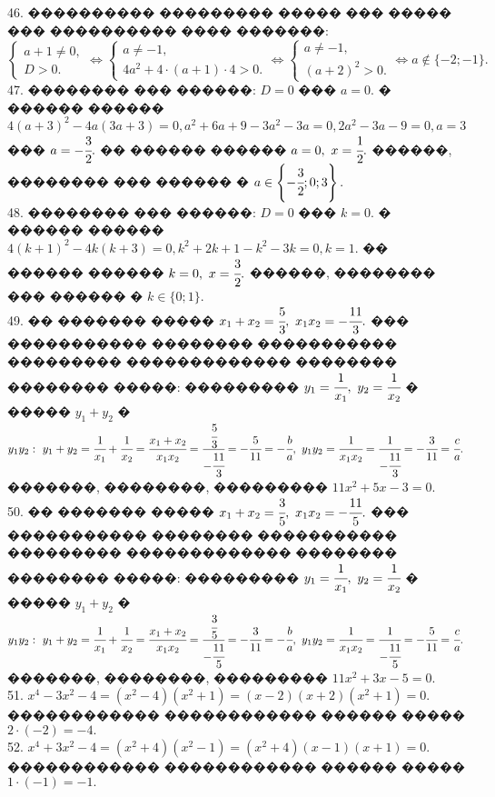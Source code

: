 \documentclass[12pt]{article}
\begin{document}
46. ���������� ��������� ����� ��� ����� ��� ���������� ���� �������:\\ $\begin{cases}a+1\neq0,\\ D>0.\end{cases}\Leftrightarrow
\begin{cases}a\neq-1,\\ 4a^2+4\cdot(a+1)\cdot4>0.\end{cases}\Leftrightarrow
\begin{cases}a\neq-1,\\ (a+2)^2>0.\end{cases}\Leftrightarrow a\notin\{-2;-1\}.$\\
47. �������� ��� ������: $D=0$ ��� $a=0.$ � ������ ������ $4(a+3)^2-4a(3a+3)=0, a^2+6a+9-3a^2-3a=0, 2a^2-3a-9=0, a=3$ ��� $a=-\cfrac{3}{2}.$ �� ������ ������ $a=0,\ x=\cfrac{1}{2}.$ ������, �������� ��� ������ � $a\in\left\{-\cfrac{3}{2}; 0; 3\right\}.$\\
48. �������� ��� ������: $D=0$ ��� $k=0.$ � ������ ������ $4(k+1)^2-4k(k+3)=0, k^2+2k+1-k^2-3k=0, k=1.$ �� ������ ������ $k=0,\ x=\cfrac{3}{2}.$ ������, �������� ��� ������ � $k\in\{0;1\}.$\\
49. �� ������� ����� $x_1+x_2=\cfrac{5}{3},\ x_1x_2=-\cfrac{11}{3}.$ ��� ����������� �������� ����������� ��������� ������������� �������� �������� �����: ��������� $y_1=\cfrac{1}{x_1},\ y_2=\cfrac{1}{x_2}$ � ����� $y_1+y_2$ � $y_1y_2:\ y_1+y_2=\cfrac{1}{x_1}+\cfrac{1}{x_2}=
\cfrac{x_1+x_2}{x_1x_2}=\cfrac{\cfrac{5}{3}}{-\cfrac{11}{3}}=-\cfrac{5}{11}=-\cfrac{b}{a},\ y_1y_2=\cfrac{1}{x_1x_2}=\cfrac{1}{-\cfrac{11}{3}}=-\cfrac{3}{11}=\cfrac{c}{a}.$ �������, ��������, ��������� $11x^2+5x-3=0.$\\
50. �� ������� ����� $x_1+x_2=\cfrac{3}{5},\ x_1x_2=-\cfrac{11}{5}.$ ��� ����������� �������� ����������� ��������� ������������� �������� �������� �����: ��������� $y_1=\cfrac{1}{x_1},\ y_2=\cfrac{1}{x_2}$ � ����� $y_1+y_2$ � $y_1y_2:\ y_1+y_2=\cfrac{1}{x_1}+\cfrac{1}{x_2}=
\cfrac{x_1+x_2}{x_1x_2}=\cfrac{\cfrac{3}{5}}{-\cfrac{11}{5}}=-\cfrac{3}{11}=-\cfrac{b}{a},\ y_1y_2=\cfrac{1}{x_1x_2}=\cfrac{1}{-\cfrac{11}{5}}=-\cfrac{5}{11}=\cfrac{c}{a}.$ �������, ��������, ��������� $11x^2+3x-5=0.$\\
51. $x^4-3x^2-4=(x^2-4)(x^2+1)=(x-2)(x+2)(x^2+1)=0.$ ������������ ������������ ������ ����� $2\cdot(-2)=-4.$\\
52. $x^4+3x^2-4=(x^2+4)(x^2-1)=(x^2+4)(x-1)(x+1)=0.$ ������������ ������������ ������ ����� $1\cdot(-1)=-1.$\\
\end{document}
